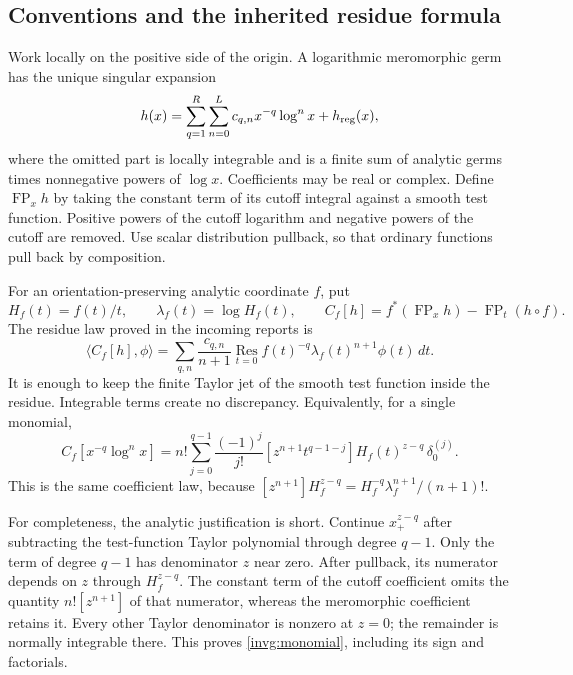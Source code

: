 \documentclass[11pt,a4paper]{article}
\theoremstyle{definition}
\theoremstyle{remark}
\numberwithin{equation}{section}
\begin{document}
\subsection{Conventions and the inherited residue formula}

Work locally on the positive side of the origin.  A logarithmic
meromorphic germ has the unique singular expansion
\begin{equation}\label{invg:germ}
 h(x)=\sum_{q=1}^{R}\sum_{n=0}^{L}c_{q,n}x^{-q}\log^n x+h_{\rm reg}(x),
\end{equation}
where the omitted part is locally integrable and is a finite sum of
analytic germs times nonnegative powers of $\log x$.  Coefficients may be
real or complex.  Define $\operatorname{FP}_x h$ by taking the constant
term of its cutoff integral against a smooth test function.  Positive
powers of the cutoff logarithm and negative powers of the cutoff are
removed.  Use scalar distribution pullback, so that ordinary functions
pull back by composition.

For an orientation-preserving analytic coordinate $f$, put
\[
 H_f(t)=f(t)/t,\qquad \lambda_f(t)=\log H_f(t),\qquad
 C_f[h]=f^*(\operatorname{FP}_x h)-\operatorname{FP}_t(h\circ f).
\]
The residue law proved in the incoming reports is
\begin{equation}\label{invg:residue}
 \langle C_f[h],\phi\rangle
 =\sum_{q,n}\frac{c_{q,n}}{n+1}
    \operatorname*{Res}_{t=0}
     f(t)^{-q}\lambda_f(t)^{n+1}\phi(t)\,dt.
\end{equation}
It is enough to keep the finite Taylor jet of the smooth test function
inside the residue.  Integrable terms create no discrepancy.  Equivalently,
for a single monomial,
\begin{equation}\label{invg:monomial}
 C_f[x^{-q}\log^n x]
 =n!\sum_{j=0}^{q-1}\frac{(-1)^j}{j!}
 [z^{n+1}t^{q-1-j}]H_f(t)^{z-q}\,\delta_0^{(j)}.
\end{equation}
This is the same coefficient law, because
$[z^{n+1}]H_f^{z-q}=H_f^{-q}\lambda_f^{n+1}/(n+1)!$.

For completeness, the analytic justification is short.  Continue
$x_+^{z-q}$ after subtracting the test-function Taylor polynomial through
degree $q-1$.  Only the term of degree $q-1$ has denominator $z$ near
zero.  After pullback, its numerator depends on $z$ through $H_f^{z-q}$.
The constant term of the cutoff coefficient omits the quantity
$n![z^{n+1}]$ of that numerator, whereas the meromorphic coefficient
retains it.  Every other Taylor denominator is nonzero at $z=0$; the
remainder is normally integrable there.  This proves
\eqref{invg:monomial}, including its sign and factorials.
\end{document}
